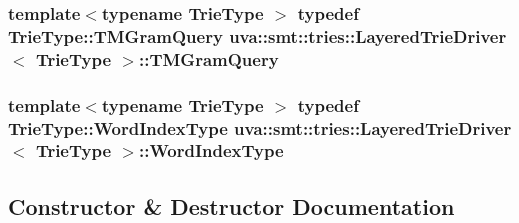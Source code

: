 \subsubsection[{T\+M\+Gram\+Query}]{\setlength{\rightskip}{0pt plus 5cm}template$<$typename Trie\+Type $>$ typedef Trie\+Type\+::\+T\+M\+Gram\+Query {\bf uva\+::smt\+::tries\+::\+Layered\+Trie\+Driver}$<$ Trie\+Type $>$\+::{\bf T\+M\+Gram\+Query}}\label{classuva_1_1smt_1_1tries_1_1_layered_trie_driver_a260d262d60ecb64e33f39609e4dcfae9}
\hypertarget{classuva_1_1smt_1_1tries_1_1_layered_trie_driver_aaa30a8f51f4e610158fa8cf0eb965c01}{}
\subsubsection[{Word\+Index\+Type}]{\setlength{\rightskip}{0pt plus 5cm}template$<$typename Trie\+Type $>$ typedef Trie\+Type\+::\+Word\+Index\+Type {\bf uva\+::smt\+::tries\+::\+Layered\+Trie\+Driver}$<$ Trie\+Type $>$\+::{\bf Word\+Index\+Type}}\label{classuva_1_1smt_1_1tries_1_1_layered_trie_driver_aaa30a8f51f4e610158fa8cf0eb965c01}


\subsection{Constructor \& Destructor Documentation}
\hypertarget{classuva_1_1smt_1_1tries_1_1_layered_trie_driver_a3227c91c276b27e1b591a378b95de510}{}
